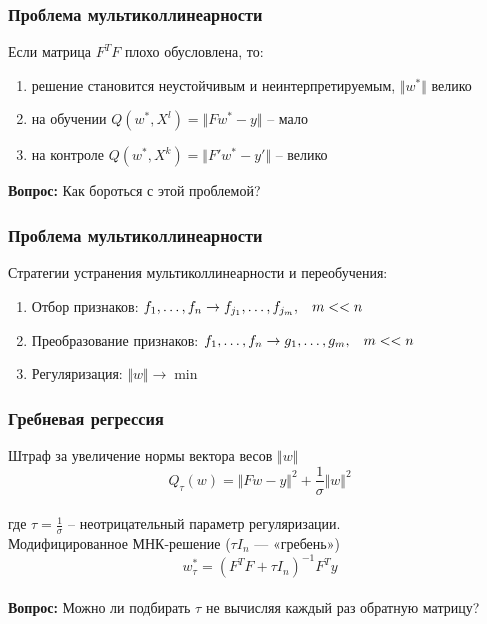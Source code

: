 \documentclass[12pt, aspectratio=169]{beamer}
\begin{document}
\begin{frame}\frametitle{Проблема мультиколлинеарности}
Если матрица $F^TF$ плохо обусловлена, то: 
\begin{enumerate}[--]
\item решение становится неустойчивым и неинтерпретируемым, $\Vert w^* \Vert $ велико
\item на обучении $Q(w^*, X^l) = \Vert Fw^* -y \Vert$ -- мало   
\item на контроле $Q(w^*, X^k) = \Vert F'w^* -y' \Vert$ -- велико
\end{enumerate}
\textbf{Вопрос:} Как бороться с этой проблемой?
\end{frame}

\begin{frame}\frametitle{Проблема мультиколлинеарности}
Стратегии устранения мультиколлинеарности и переобучения:
\begin{enumerate}[--]
\item Отбор признаков: $f_1, \dots, f_n \rightarrow f_{j_1}, \dots, f_{j_m}, \hspace{3mm} m << n$
\item Преобразование признаков: $f_1, \dots, f_n \rightarrow g_1, \dots, g_m,\hspace{3mm}  m << n$
\item Регуляризация: $\Vert w \Vert \rightarrow \min$
\end{enumerate}
\end{frame}


\begin{frame}\frametitle{Гребневая регрессия}
Штраф за увеличение нормы вектора весов $\Vert w \Vert$\\
$$Q_{\tau} (w) = \Vert F w - y \Vert^2 + \frac{1}{\sigma} \Vert w \Vert^2$$\\
где $\tau = \frac{1}{\sigma}$ -- неотрицательный параметр регуляризации.\\
\vspace{5mm}
Модифицированное МНК-решение ($\tau I_n$ — «гребень»)\\
$$w^*_{\tau} = (F^TF + \tau I_n)^{-1}F^Ty$$\\

\textbf{Вопрос:} Можно ли подбирать $\tau$ не вычисляя каждый раз обратную матрицу?
\end{frame}
\end{document}
